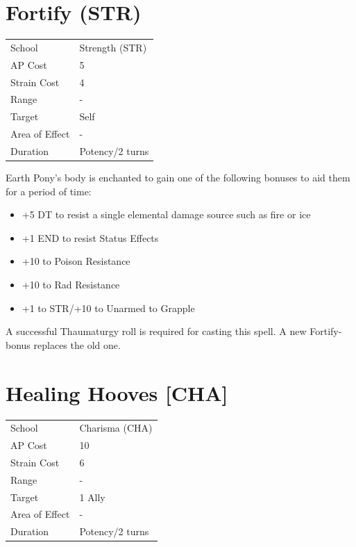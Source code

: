 \documentclass[11pt,a4paper,twocolumn]{book}
\begin{document}
\section*{Fortify (STR)}
{
	\begin{tabu} to 75mm{| X[l,4] | X[l,7] |}
		\hline
		School 			& Strength (STR) 	\\
        AP Cost	      	& 5 				\\
        Strain Cost     & 4 				\\
        Range     		& - 				\\
        Target      	& Self 				\\
        Area of Effect  & - 	 			\\
        Duration     	& Potency/2 turns 	\\ \hline
	\end{tabu}
		
}

\medskip

Earth Pony's body is enchanted to gain one of the following bonuses to aid them for a period of time:
\begin{itemize}
  \item +5 DT to resist a single elemental damage source such as fire or ice
  \item +1 END to resist Status Effects
  \item +10 to Poison Resistance
  \item +10 to Rad Resistance
  \item +1 to STR/+10 to Unarmed to Grapple
\end{itemize}
	
A successful Thaumaturgy roll is required for casting this spell. A new Fortify-bonus replaces the old one.

\vfill

\section*{Healing Hooves [CHA]}
{
	\begin{tabu} to 75mm{| X[l,4] | X[l,7] |}
		\hline
		School 			& Charisma (CHA) 	\\
        AP Cost	      	& 10 				\\
        Strain Cost     & 6 				\\
        Range     		& - 				\\
        Target      	& 1 Ally 			\\
        Area of Effect  & - 	 			\\
        Duration     	& Potency/2 turns 	\\ \hline
	\end{tabu}
		
}
\end{document}
